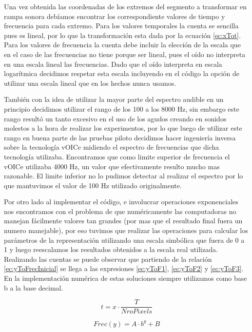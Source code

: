 \documentclass{article}
\begin{document}
    Una vez obtenida las coordenadas de los extremos del segmento a transformar en rampa sonora debíamos encontrar los correspondiente valores de tiempo y frecuencia para cada extremo. Para los valores temporales la cuenta se sencilla pues es lineal, por lo que la transformación esta dada por la ecuación \ref{ec:xTot}. Para los valores de frecuencia la cuenta debe incluir la elección de la escala que en el caso de las frecuencias no tiene porque ser lineal, pues el oído no interpreta en una escala lineal las frecuencias. Dado que el oído interpreta en escala logarítmica decidimos respetar esta escala incluyendo en el código la opción de utilizar una escala lineal que en los hechos nunca usamos. 
    
    También con la idea de utilizar la mayor parte del espectro audible en un principio decidimos utilizar el rango de los 100 a los 8000 Hz, sin embargo este rango resultó un tanto excesivo en el uso de los agudos creando en sonidos molestos a la hora de realizar los experimentos, por lo que luego de utilizar este rango en buena parte de las pruebas piloto decidimos hacer ingeniería inversa sobre la tecnología vOICe midiendo el espectro de frecuencias que dicha tecnología utilizaba. Encontramos que como limite superior de frecuencia el vOICe utilizaba 4000 Hz, un valor que efectivamente resulto mucho mas razonable. El limite inferior no lo pudimos detectar al realizar el espectro por lo que mantuvimos el valor de 100 Hz utilizado originalmente. 
    
    Por otro lado al implementar el código, e involucrar operaciones exponenciales nos encontramos con el problema de que numéricamente las computadoras no manejan fácilmente valores tan grandes (por mas que el resultado final fuera un numero manejable), por eso tuvimos que realizar las operaciones para calcular los parámetros de la representación utilizando una escala simbólica que fuera de 0 a 1 y luego reescalamos los resultados obtenidos a la escala real utilizada. Realizando las cuentas se puede observar que partiendo de la relación \ref{ec:yToFrecInicial} se llega a las expresiones  \ref{ec:yToF1}, \ref{ec:yToF2} y \ref{ec:yToF3}. En la implementación numérica de estas soluciones siempre utilizamos como base b a la base decimal. 
    
    \begin{equation}
        \label{ec:xTot}
        t = x \cdot \frac{T}{NroPixels}
    \end{equation}
    
    \begin{equation}
        \label{ec:yToFrecInicial}
        Frec(y) = A \cdot b^{y} + B
    \end{equation}
    
\end{document}
